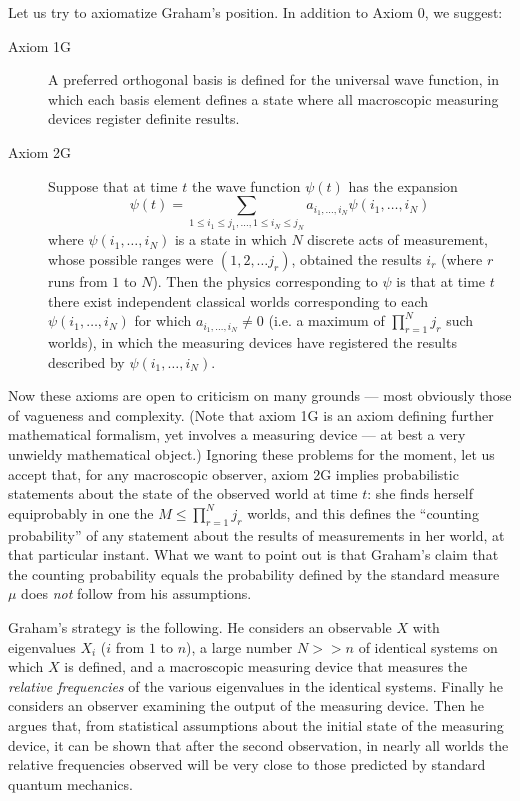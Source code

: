 \documentclass[aps,pra,12pt]{revtex4}
\begin{document}
Let us try to axiomatize Graham's position.  In addition to Axiom 0, we 
suggest:
\begin{description}
\item[Axiom 1G] A preferred orthogonal 
basis is defined for the universal wave function,
in which each basis element defines a state 
where all macroscopic measuring devices register definite results.  

\item[Axiom 2G]
Suppose that at time $t$ the wave function $\psi(t)$ has the expansion 
\begin{equation}
\psi(t) = \sum_{1 \leq i_1 \leq j_1 , \ldots , 1 \leq i_N \leq j_N} 
a_{i_1 , \ldots , i_N} \psi (i_1 , \ldots , i_N )
\end{equation}
where $\psi (i_1 , \ldots , i_N )$ is a state in which $N$ discrete
acts of measurement, whose possible ranges were $(1,2, \ldots j_r)$, 
obtained the results $i_r$ (where $r$ runs from $1$ to $N$). 
Then the physics corresponding to $\psi$ is that at time $t$ there 
exist independent classical worlds corresponding to each 
$\psi (i_1 , \ldots , i_N )$ for which $a_{i_1 , \ldots , i_N} \neq 0$
(i.e. a maximum of $\prod_{r=1}^N  j_r$ such worlds), in which the 
measuring devices have registered the results described 
by $\psi (i_1 , \ldots , i_N )$. 
\end{description}

Now these axioms are open to criticism on many grounds --- most obviously
those of vagueness and complexity. (Note that axiom 1G is an axiom defining
further mathematical formalism, yet involves a measuring device --- at best
a very unwieldy mathematical object.)
Ignoring these problems for the moment,
let us accept that, for any macroscopic observer, axiom 2G implies
probabilistic statements about the state of the observed world at time $t$:
she finds herself equiprobably in one the $M \leq \prod_{r=1}^N  j_r$ worlds,
and this defines the ``counting probability'' of any statement about 
the results of measurements in her world, at that particular instant. 
What we want to point out is that Graham's claim that the counting
probability equals the probability defined by the standard measure $\mu$ 
does {\em not} follow from his assumptions.

Graham's strategy is the following.  
He considers an observable $X$ with eigenvalues $X_i$ ($i$ from $1$ to $n$),
a large number $N >> n$ of identical systems on which $X$ is defined,
and a macroscopic measuring device that measures the 
{\em relative frequencies} of the various eigenvalues in the identical
systems. 
Finally he considers an observer examining the output of the measuring device.
Then he argues that, from statistical assumptions about the initial state
of the measuring device, it can be shown that after the second observation,
in nearly all worlds 
the relative frequencies observed will be very close to those predicted by
standard quantum mechanics. 
\end{document}
